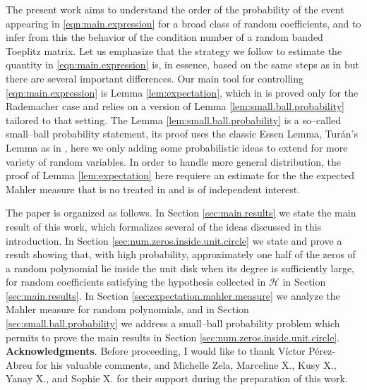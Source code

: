 \documentclass[12pt]{amsart}
\theoremstyle{plain}
\numberwithin{equation}{section}
\newcommand{\<}{\langle}
\renewcommand{\>}{\rangle}
\begin{document}
The present work aims to understand the order of the probability of the event appearing in \ref{eqn:main.expression} for a broad class of random coefficients, and to infer from this the behavior of the condition number of a random banded Toeplitz matrix. Let us emphasize that the strategy we follow to estimate the quantity in \ref{eqn:main.expression} is, in essence, based on the same steps as in \cite{yakir2021approximately} but there are several important differences. Our main tool for controlling \ref{eqn:main.expression} is Lemma \ref{lem:expectation}, which in \cite{yakir2021approximately} is proved only for the Rademacher case and relies on a version of Lemma \ref{lem:small.ball.probability} tailored to that setting. The Lemma \ref{lem:small.ball.probability} is a so--called small--ball probability statement, its proof uses the classic Essen Lemma, Tur\'an's Lemma as in \cite{yakir2021approximately}, here we only adding some probabilistic ideas to extend for more variety of random variables. In order to handle more general distribution, the proof of Lemma \ref{lem:expectation} here requiere an estimate for the the expected Mahler measure \cite{smyth2007mahler} that is no treated in \cite{yakir2021approximately} and is of independent interest.

The paper is organized as follows. In Section \ref{sec:main.results} we state the main result of this work, which formalizes several of the ideas discussed in this introduction. In Section \ref{sec:num.zeros.inside.unit.circle} we state and prove a result showing that, with high probability, approximately one half of the zeros of a random polynomial lie inside the unit disk when its degree is sufficiently large, for random coefficients satisfying the hypothesis collected in $\mathcal{H}$ in Section \ref{sec:main.results}. In Section \ref{sec:expectation.mahler.measure} we analyze the Mahler measure for random polynomials, and in Section \ref{sec:small.ball.probability} we address a small--ball probability problem which permits to prove the main results in Section \ref{sec:num.zeros.inside.unit.circle}.\\

{\bf Acknowledgments}. Before proceeding, I would like to thank Víctor Pérez-Abreu for his valuable comments, and Michelle Zela, Marceline X., Kusy X., Yanay X., and Sophie X. for their support during the preparation of this work.
\end{document}
